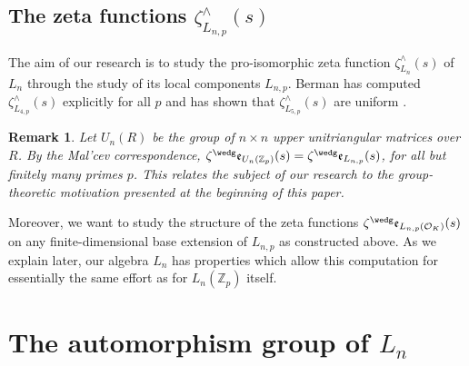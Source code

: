 \documentclass{article}
\newtheorem{remark}[theorem]{Remark}
\newcommand{\e}{\mathfrak{e}}
\begin{document}
\subsection{The zeta functions $\zeta_{L_{n,p}}^{\wedge}(s)$}
The aim of our research is to study the pro-isomorphic zeta function $\zeta_{L_n}^{\wedge}(s)$ of $L_{n}$ through the study of its local components $L_{n,p}$. Berman has computed $\zeta_{L_{4,p}}^{\wedge}(s)$ explicitly for all $p$ \cite[\S{3.3.7}]{BermanThesis} and has shown that $\zeta_{L_{5,p}}^{\wedge}(s)$ are uniform \cite[Proposition 3.12]{BermanThesis}.
\begin{remark}
Let $U_n(R)$ be the group of $n\times{n}$ upper unitriangular matrices over $R$. By the Mal'cev correspondence, ${\zeta^\wedg\e_{U_{n}(\mathbb{Z}_{p})}}(s)={\zeta^\wedg\e_{L_{n,p}}}(s)$, for all but finitely many primes $p$. This relates the subject of our research to the group-theoretic motivation presented at the beginning of this paper.
\end{remark}
Moreover, we want to study the structure of the zeta functions $\zeta^\wedg\e_{L_{n,p}(\mathcal{O}_K)}(s)$ on any finite-dimensional base extension of $L_{n,p}$ as constructed above. As we explain later, our algebra $L_n$ has properties which allow this computation for essentially the same effort as for $L_n(\mathbb{Z}_p)$ itself.
\section{The automorphism group of $L_n$}
\end{document}
